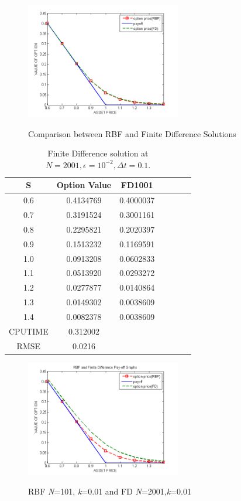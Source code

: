 \documentclass[12pt]{article}
\numberwithin{equation}{section} %
\begin{document}
\begin{figure}[h]
\begin{centering}
\includegraphics[height=2in]{rbffdpo.png}\
\caption{Comparison between RBF and Finite Difference Solutions }
\vskip -0.5in \vskip -0.5in
\end{centering}
\end{figure}

\begin{table}[h]
\centering
\begin{tabular}{|c|c|c|c|c|c|c|}
  \hline
  S &  Option Value& FD1001  \\
  \hline

  0.6 & 0.4134769 &0.4000037 \\
  0.7 &0.3191524&0.3001161 \\
  0.8 &0.2295821& 0.2020397 \\
  0.9 & 0.1513232&0.1169591  \\
  1.0 & 0.0913208&0.0602833 \\
  1.1 & 0.0513920&0.0293272\\
  1.2 & 0.0277877&0.0140864 \\
  1.3 & 0.0149302 &0.0038609 \\
  1.4& 0.0082378&0.0038609 \\
 \hline
CPUTIME&0.312002&\\
\hline
 RMSE&0.0216&\\
  \hline

\end{tabular}
  \caption{Finite Difference solution at $N=2001,\epsilon=10^{-2},\Delta t=0.1$.}\label{Tab_}
\end{table}

\begin{figure}
\begin{centering}
\includegraphics[height=2in]{rbffd101.png}\ \caption{RBF \textit{N}=101, \textit{k}=0.01 and FD
\textit{N}=2001,\textit{k}=0.01 }
 \vskip -0.5in

\end{centering}
\end{figure}
\end{document}
